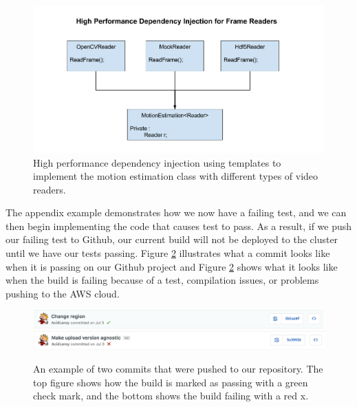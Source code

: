 \begin{figure}[h]
  \label{fig:hiperf_dependency}
  \centering
  \includegraphics[width=\textwidth]{figures/dependency_injection}
  \caption{High performance dependency injection using templates to implement the
  motion estimation class with different types of video readers.}
\end{figure}

The appendix example demonstrates how we now have a failing test, and we can then
begin implementing the code that causes test to pass. As a result, if we
push our failing test to Github, our current build will not be deployed to the cluster
until we have our tests passing. Figure \ref{fig:passing} illustrates what a commit
looks like when it is passing on our Github project and Figure \ref{fig:passing}
shows what it looks like when the build is failing because of a test, compilation
issues, or problems pushing to the AWS cloud.

\begin{figure}[h]
  \label{fig:passing}
  \centering
  \includegraphics[width=\textwidth]{figures/passing}
  \includegraphics[width=\textwidth]{figures/failing}
  \caption{An example of two commits that were pushed to our repository. The
  top figure shows how the build is marked as passing with a green check mark,
  and the bottom shows the build failing with a red x.}
\end{figure}
